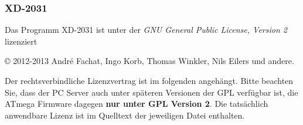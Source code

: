 \documentclass[10pt,a4paper]{scrartcl}		%
\begin{document}
\subsubsection{XD-2031}
Das Programm \glqq{}XD-2031\grqq{} ist unter der
\textit{GNU General Public License, Version 2} lizenziert

\copyright{} 2012-2013 André Fachat, Ingo Korb, Thomas Winkler,
Nils Eilers und andere.

Der rechtsverbindliche Lizenzvertrag ist im folgenden angehängt.
Bitte beachten Sie, dass der PC Server auch unter späteren
Versionen der GPL verfügbar ist, die ATmega Firmware dagegen
\textbf{nur unter GPL Version 2}. Die tatsächlich anwendbare
Lizenz ist im Quelltext der jeweiligen Datei enthalten.



\renewcommand{\indexname}{Stichwortverzeichnis}
\printindex
\end{document}
